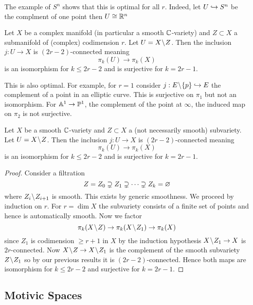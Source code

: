 \documentclass[12pt]{article}
\begin{document}
\begin{rmk}
The example of $S^n$ shows that this is optimal for all $r$. Indeed, let $U \hookrightarrow S^n$ be the complment of one point then $U \cong \mathbb{R}^n$ 
\end{rmk}

\begin{cor}
Let $X$ be a complex manifold (in particular a smooth $\mathbb{C}$-variety) and $Z \subset X$ a submanifold of (complex) codimension $r$. Let $U = X \! \setminus \! Z$. Then the inclusion $j : U \to X$ is $(2r-2)$-connected meaning 
\[ \pi_k(U) \to \pi_k(X) \]
is an isomorphism for $k \le 2r-2$ and is surjective for $k = 2r - 1$.
\end{cor}

\begin{rmk}
This is also optimal. For example, for $r = 1$ consider $j : E \! \setminus \! \{ p \} \hookrightarrow E$ the complement of a point in an elliptic curve. This is surjective on $\pi_1$ but not an isomorphism. For $\mathbb{A}^1 \to \mathbb{P}^1$, the complement of the point at $\infty$, the induced map on $\pi_2$ is not surjective. 
\end{rmk}

\begin{cor}
Let $X$ be a smooth $\mathbb{C}$-variety and $Z \subset X$ a (not necessarily smooth) subvariety. Let $U = X \! \setminus \! Z$. Then the inclusion $j : U \to X$ is $(2r - 2)$-connected meaning
\[ \pi_k(U) \to \pi_k(X) \]
is an isomorphism for $k \le 2r - 2$ and is surjective for $k = 2r - 1$.
\end{cor}

\begin{proof}
Consider a filtration
\[ Z = Z_0 \supsetneq Z_1 \supsetneq \cdots \supsetneq Z_k = \varnothing \]
where $Z_i \! \setminus \! Z_{i+1}$ is smooth. This exists by generic smoothness. We proceed by induction on $r$. For $r = \dim{X}$ the subvariety consists of a finite set of points and hence is automatically smooth. Now we factor
\[ \pi_k(X \! \setminus \! Z) \to \pi_k(X \! \setminus \! Z_1) \to \pi_k(X) \]
since $Z_1$ is codimension $\ge r + 1$ in $X$ by the induction hypothesis $X \! \setminus \! Z_1 \to X$ is $2r$-connected. Now $X \! \setminus \! Z \to X \! \setminus \! Z_1$ is the complement of the smooth subvariety $Z \! \setminus \! Z_1$ so by our previous results it is $(2r-2)$-connected. Hence both maps are isomorphism for $k \le 2r-2$ and surjective for $k = 2r - 1$.
\end{proof}


\subsection{Motivic Spaces}
\end{document}
